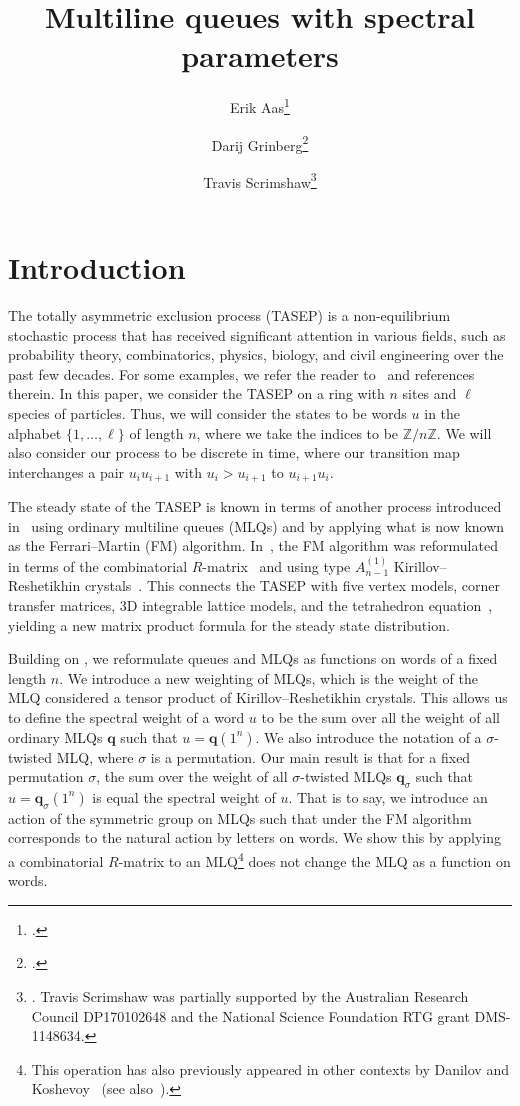 \documentclass[submission]{FPSAC2018}
\title[MLQs with spectral parameters]{Multiline queues with spectral parameters}
\author[E.~Aas \and D.~Grinberg \and T.~Scrimshaw]{Erik Aas\thanks{\email{eaas@kth.se}.}\addressmark{1}
\and Darij Grinberg\thanks{\email{darij.grinberg@gmail.com}.}\addressmark{2}
\and Travis Scrimshaw\thanks{\email{tcscrims@gmail.com}. Travis Scrimshaw was partially supported by the Australian Research Council DP170102648 and the National Science Foundation RTG grant DMS-1148634.}\addressmark{3}}
\newcommand{\qq}{\mathbf{q}}
\newcommand{\ZZ}{\mathbb{Z}}
\theoremstyle{plain}
\theoremstyle{definition}
\numberwithin{equation}{section}
\begin{document}
\maketitle

\section{Introduction}
\label{sec:introduction}

The totally asymmetric exclusion process (TASEP) is a non-equilibrium stochastic process  that has received significant attention in various fields, such as probability theory, combinatorics, physics, biology, and civil engineering over the past few decades.
For some examples, we refer the reader to~\cite{AasLin17,AAMP,BE07,BP14,DEHP93,KMO15,KMO16} and references therein.
In this paper, we consider the TASEP on a ring with $n$ sites and $\ell$ species of particles.
Thus, we will consider the states to be words $u$ in the alphabet $\{1, \dotsc, \ell\}$ of length $n$, where we take the indices to be $\ZZ / n \ZZ$.
We will also consider our process to be discrete in time, where our transition map interchanges a pair $u_i u_{i+1}$ with $u_i > u_{i+1}$ to $u_{i+1} u_i$.

The steady state of the TASEP is known in terms of another process introduced in~\cite{FM06} using ordinary multiline queues (MLQs) and by applying what is now known as the Ferrari--Martin (FM) algorithm.
In~\cite{KMO15,KMO16}, the FM algorithm was reformulated in terms of the combinatorial $R$-matrix~\cite{NY97,Shimozono02} and using type $A_{n-1}^{(1)}$ Kirillov--Reshetikhin crystals~\cite{KKMMNN92}.
This connects the TASEP with five vertex models, corner transfer matrices, 3D integrable lattice models, and the tetrahedron equation~\cite{Zam80}, yielding a new matrix product formula for the steady state distribution.

Building on \cite{AAMP}, we reformulate queues and MLQs as functions on words of a fixed length $n$.
We introduce a new weighting of MLQs, which is the weight of the MLQ considered a tensor product of Kirillov--Reshetikhin crystals.
This allows us to define the spectral weight of a word $u$ to be the sum over all the weight of all ordinary MLQs $\qq$ such that $u = \qq(1^n)$.
We also introduce the notation of a $\sigma$-twisted MLQ, where $\sigma$ is a permutation.
Our main result is that for a fixed permutation $\sigma$, the sum over the weight of all $\sigma$-twisted MLQs $\qq_{\sigma}$ such that $u = \qq_{\sigma}(1^n)$ is equal the spectral weight of $u$.
That is to say, we introduce an action of the symmetric group on MLQs such that under the FM algorithm corresponds to the natural action by letters on words.
We show this by applying a combinatorial $R$-matrix to an MLQ\footnote{This operation has also previously appeared in other contexts by Danilov and Koshevoy~\cite{DanilovKoshevoy} (see also~\cite[Ch.~4]{Gorodentsev2}).} does not change the MLQ as a function on words.
\end{document}
